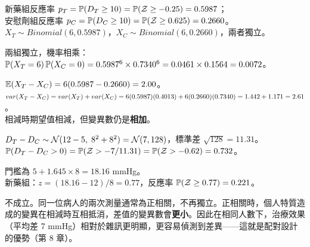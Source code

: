 \begin{answers}
    \item 新藥組反應率 $p_T = \mathbb{P}(D_T \ge 10) = \mathbb{P}(\mathcal{Z} \ge -0.25) = 0.5987$；\\
          安慰劑組反應率 $p_C = \mathbb{P}(D_C \ge 10) = \mathbb{P}(\mathcal{Z} \ge 0.625) = 0.2660$。\\
          $X_T \sim Binomial(6, 0.5987)$，$X_C \sim Binomial(6, 0.2660)$，兩者獨立。
    \item 兩組獨立，機率相乘：$\mathbb{P}(X_T = 6)\,\mathbb{P}(X_C = 0) = 0.5987^6 \times 0.7340^6 = 0.0461 \times 0.1564 = 0.0072$。
    \item $\mathbb{E}(X_T - X_C) = 6(0.5987 - 0.2660) = 2.00$。\\
          $var(X_T - X_C) = var(X_T) + var(X_C) = 6(0.5987)(0.4013) + 6(0.2660)(0.7340) = 1.442 + 1.171 = 2.61$。\\
          相減時期望值相減，但變異數仍是\textbf{相加}。
    \item $D_T - D_C \sim \mathcal{N}(12-5,\; 8^2+8^2) = \mathcal{N}(7, 128)$，標準差 $\sqrt{128} = 11.31$。\\
          $\mathbb{P}(D_T - D_C > 0) = \mathbb{P}(\mathcal{Z} > -7/11.31) = \mathbb{P}(\mathcal{Z} > -0.62) = 0.732$。
    \item 門檻為 $5 + 1.645 \times 8 = 18.16$ mmHg。\\
          新藥組：$z = (18.16-12)/8 = 0.77$，反應率 $\mathbb{P}(\mathcal{Z} \ge 0.77) = 0.221$。
    \item 不成立。同一位病人的兩次測量通常為正相關，不再獨立。正相關時，個人特質造成的變異在相減時互相抵消，差值的變異數會\textbf{更小}。因此在相同人數下，治療效果（平均差 7 mmHg）相對於雜訊更明顯，更容易偵測到差異——這就是配對設計的優勢（第 8 章）。
\end{answers}


